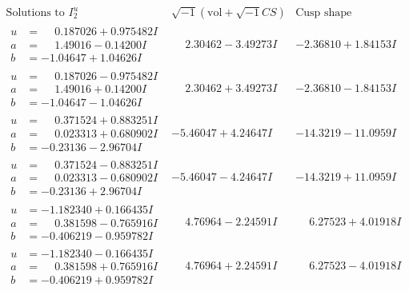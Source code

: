 \documentclass[1p]{elsarticle_modified}
\theoremstyle{definition}
\newcommand{\I}{\sqrt{-1}}
\begin{document}
$$\begin{array}{c|c|c}  
\text{Solutions to }I^u_{2}& \I (\text{vol} + \sqrt{-1}CS) & \text{Cusp shape}\\
 \hline 
\begin{aligned}
u &= \phantom{-}0.187026 + 0.975482 I \\
a &= \phantom{-}1.49016 - 0.14200 I \\
b &= -1.04647 + 1.04626 I\end{aligned}
 & \phantom{-}2.30462 - 3.49273 I & -2.36810 + 1.84153 I \\ \hline\begin{aligned}
u &= \phantom{-}0.187026 - 0.975482 I \\
a &= \phantom{-}1.49016 + 0.14200 I \\
b &= -1.04647 - 1.04626 I\end{aligned}
 & \phantom{-}2.30462 + 3.49273 I & -2.36810 - 1.84153 I \\ \hline\begin{aligned}
u &= \phantom{-}0.371524 + 0.883251 I \\
a &= \phantom{-}0.023313 + 0.680902 I \\
b &= -0.23136 - 2.96704 I\end{aligned}
 & -5.46047 + 4.24647 I & -14.3219 - 11.0959 I \\ \hline\begin{aligned}
u &= \phantom{-}0.371524 - 0.883251 I \\
a &= \phantom{-}0.023313 - 0.680902 I \\
b &= -0.23136 + 2.96704 I\end{aligned}
 & -5.46047 - 4.24647 I & -14.3219 + 11.0959 I \\ \hline\begin{aligned}
u &= -1.182340 + 0.166435 I \\
a &= \phantom{-}0.381598 - 0.765916 I \\
b &= -0.406219 - 0.959782 I\end{aligned}
 & \phantom{-}4.76964 - 2.24591 I & \phantom{-}6.27523 + 4.01918 I \\ \hline\begin{aligned}
u &= -1.182340 - 0.166435 I \\
a &= \phantom{-}0.381598 + 0.765916 I \\
b &= -0.406219 + 0.959782 I\end{aligned}
 & \phantom{-}4.76964 + 2.24591 I & \phantom{-}6.27523 - 4.01918 I \\ \hline\begin{aligned}

\end{aligned}
\end{array}$$
\end{document}
